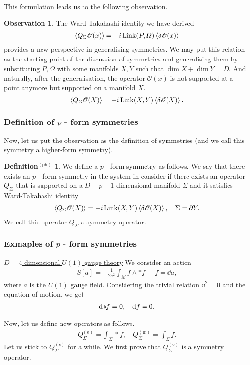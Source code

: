 \documentclass[dvipdfmx]{article}
\theoremstyle{definition}
\newtheorem{definitionph}{Definition$^\mathrm{(ph)}$}[section]
\newtheorem{observation}{Observation}[section]
\numberwithin{equation}{section}
\newcommand{\link}{\mathrm{Link}}
\newcommand{\hodge}{\hspace{-0.5mm}*\hspace{-1mm}}
\newenvironment{obsv}{
  \begin{tcolorbox}[colframe=white, arc=0mm, colback=gray!25]
    \begin{observation}
    }{
    \end{observation}
  \end{tcolorbox}
}
\newenvironment{defn}{
  \begin{tcolorbox}[colframe=white, arc=0mm, colback=gray!25]
    \begin{definitionph}
    }{
    \end{definitionph}
  \end{tcolorbox}
}
\newenvironment{ex}[1]{
  \underline{#1}
}{
  
}
\begin{document}
This formulation leads us to the following observation.
\begin{obsv}
  The Ward-Takahashi identity we have derived
  \begin{align}
    \ev{Q_\Sigma \mathscr{O}(x)} = -i \, \link(P, \varOmega) \ev{\delta \mathscr{O}(x)}
  \end{align}
  provides a new perspective in generalising symmetries. We may put this relation as the starting point of the discussion of symmetries and generalising them by substituting $P, \varOmega$ with some manifolds $X, Y$ such that $\dim X + \dim Y = D$. And naturally, after the generalisation, the operator $\mathscr{O}(x)$ is not supported at a point anymore but supported on a manifold $X$.
  \begin{align}
    \ev{Q_\Sigma \mathscr{O}(X)} = -i \, \link(X, Y) \ev{\delta \mathscr{O}(X)}.
  \end{align}
\end{obsv}

\subsubsection{Definition of $p$ - form symmetries}
Now, let us put the observation as the definition of symmetries (and we call this symmetry a higher-form symmetry).
\begin{defn}
  We define a $p$ - form symmetry as follows. We say that there exists an $p$ - form symmetry in the system in consider if there exists an operator $Q_\Sigma$ that is supported on a $D - p - 1$ dimensional manifold $\Sigma$ and it satisfies Ward-Takahashi identity
  \begin{align}
    \ev{Q_\Sigma \mathscr{O}(X)} = -i \, \link(X, Y) \ev{\delta \mathscr{O}(X)}, \quad \Sigma = \partial Y.
  \end{align}
  We call this operator $Q_\Sigma$ a symmetry operator.
\end{defn}

\subsubsection{Exmaples of $p$ - form symmetries}
\begin{ex}{$D = 4$ dimensional $U(1)$ gauge theory} We consider an action
  \begin{align}
    S[a] = -\frac{1}{2e^2} \int_{M} f \wedge *f, \quad f = \dd a,
  \end{align}
  where $a$ is the $U(1)$ gauge field. Considering the trivial relation $\dd^2 = 0$ and the equation of motion, we get
  \begin{align}
    \dd \hodge f = 0, \quad \dd f = 0.
  \end{align}

  Now, let us define new operators as follows.
  \begin{align}
    Q^{(\mathrm{e})}_\Sigma = \int_\Sigma *f, \quad Q^{(\mathrm{m})}_\Sigma = \int_\Sigma f.
  \end{align}
  Let us stick to $Q^{(\mathrm{e})}_\Sigma$ for a while. We first prove that $Q^{(\mathrm{e})}_\Sigma$ is a symmetry operator. 
\end{ex}
\end{document}
